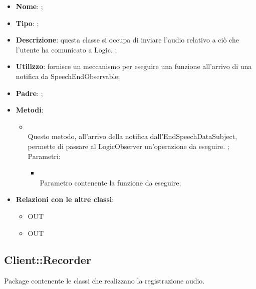 \begin{itemize}
	\item \textbf{Nome}: ;
	\item \textbf{Tipo}: ;
	\item \textbf{Descrizione}: questa classe si occupa di inviare l'audio relativo a ciò che  l'utente ha comunicato a Logic.
;
	\item \textbf{Utilizzo}: fornisce un meccanismo per eseguire una funzione all'arrivo di una notifica da SpeechEndObservable;
	\item \textbf{Padre}: ;
	\item \textbf{Metodi}:
	\begin{itemize}
		\item[]  \\
		Questo metodo, all'arrivo della notifica dall'EndSpeechDataSubject, permette di passare al LogicObserver un'operazione da eseguire. ;\\
		Parametri:
		\begin{itemize}
			\item {} \\
			Parametro contenente la funzione da eseguire;
		\end{itemize}
	\end{itemize}
	\item \textbf{Relazioni con le altre classi}:
	\begin{itemize}
		\item OUT \hyperlink{SpeechEndObservable_label}{}
		\item OUT \hyperlink{HttpPromise_label}{}
	\end{itemize}
\end{itemize}

\subsection{Client::Recorder}
Package contenente le classi che realizzano la registrazione audio.
